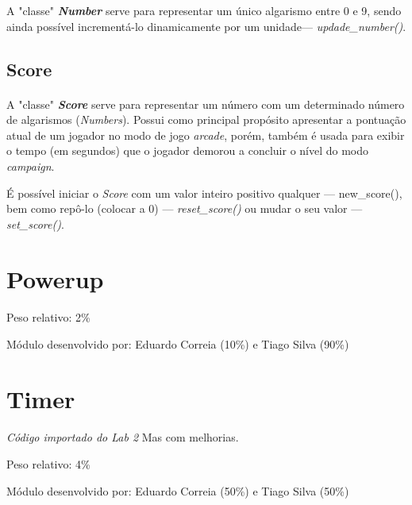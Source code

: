 \documentclass{report}
\begin{document}
A "classe" \textbf{\textit{Number}} serve para representar um único algarismo entre 0 e 9, sendo ainda possível incrementá-lo dinamicamente por um unidade\footnotemark --- \textit{updade\_number()}.


\subsection{Score}
\paragraph{}
A "classe" \textbf{\textit{Score}} serve para representar um número com um determinado número de algarismos (\textit{Numbers}). Possui como principal propósito apresentar a pontuação atual de um jogador no modo de jogo \textit{arcade}, porém, também é usada para exibir o tempo (em segundos) que o jogador demorou a concluir o nível do modo \textit{campaign}.

É possível iniciar o \textit{Score} com um valor inteiro positivo qualquer --- new\_score(), bem como repô-lo (colocar a 0) --- \textit{reset\_score()} ou mudar o seu valor --- \textit{set\_score()}. \newline


\section{Powerup}

\paragraph{}
Peso relativo: 2\%

Módulo desenvolvido por: Eduardo Correia (10\%) e Tiago Silva (90\%)

\section{Timer}

\paragraph{}
\textit{Código importado do Lab 2}\footnotemark\newline
Mas com melhorias.

Peso relativo: 4\%

Módulo desenvolvido por: Eduardo Correia (50\%) e Tiago Silva (50\%)
\end{document}
